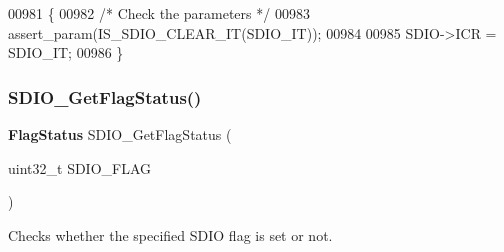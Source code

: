 \begin{DoxyCode}
00981 \{ 
00982   \textcolor{comment}{/* Check the parameters */}
00983   assert_param(IS_SDIO_CLEAR_IT(SDIO\_IT));
00984    
00985   SDIO->ICR = SDIO\_IT;
00986 \}
\end{DoxyCode}
\mbox{\label{group__SDIO__Group7_ga644514b4b3c95c5c4326d99cd166f6f9}} 
\subsubsection{S\+D\+I\+O\+\_\+\+Get\+Flag\+Status()}
{\footnotesize\ttfamily \textbf{ Flag\+Status} S\+D\+I\+O\+\_\+\+Get\+Flag\+Status (\begin{DoxyParamCaption}\item[{uint32\+\_\+t}]{S\+D\+I\+O\+\_\+\+F\+L\+AG }\end{DoxyParamCaption})}



Checks whether the specified S\+D\+IO flag is set or not. 



